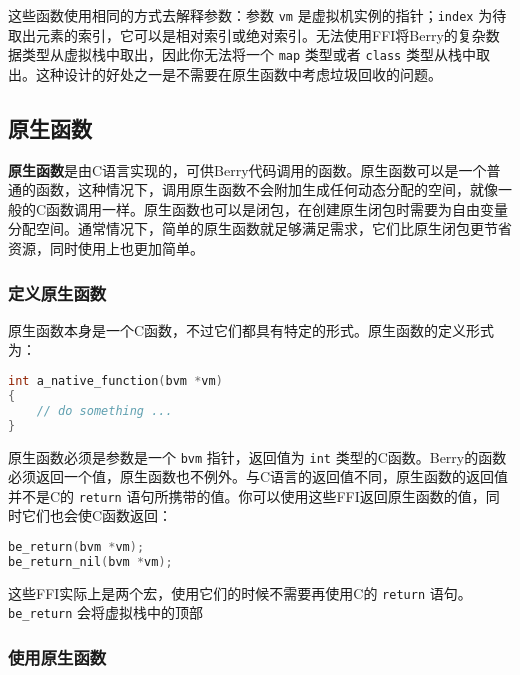 这些函数使用相同的方式去解释参数：参数 \texttt{vm} 是虚拟机实例的指针；\texttt{index} 为待取出元素的索引，它可以是相对索引或绝对索引。无法使用FFI将Berry的复杂数据类型从虚拟栈中取出，因此你无法将一个 \texttt{map} 类型或者 \texttt{class} 类型从栈中取出。这种设计的好处之一是不需要在原生函数中考虑垃圾回收的问题。

\subsection{原生函数}

\textbf{原生函数}是由C语言实现的，可供Berry代码调用的函数。原生函数可以是一个普通的函数，这种情况下，调用原生函数不会附加生成任何动态分配的空间，就像一般的C函数调用一样。原生函数也可以是闭包，在创建原生闭包时需要为自由变量分配空间。通常情况下，简单的原生函数就足够满足需求，它们比原生闭包更节省资源，同时使用上也更加简单。

\subsubsection{定义原生函数}

原生函数本身是一个C函数，不过它们都具有特定的形式。原生函数的定义形式为：
\begin{lstlisting}[language=c, style=berry, numbers=none]
int a_native_function(bvm *vm)
{
    // do something ...
}
\end{lstlisting}
原生函数必须是参数是一个 \texttt{bvm} 指针，返回值为 \texttt{int} 类型的C函数。Berry的函数必须返回一个值，原生函数也不例外。与C语言的返回值不同，原生函数的返回值并不是C的 \texttt{return} 语句所携带的值。你可以使用这些FFI返回原生函数的值，同时它们也会使C函数返回：
\begin{lstlisting}[language=c, style=berry, numbers=none]
be_return(bvm *vm);
be_return_nil(bvm *vm);
\end{lstlisting}
这些FFI实际上是两个宏，使用它们的时候不需要再使用C的 \texttt{return} 语句。\texttt{be\_return} 会将虚拟栈中的顶部

\subsubsection{使用原生函数}

